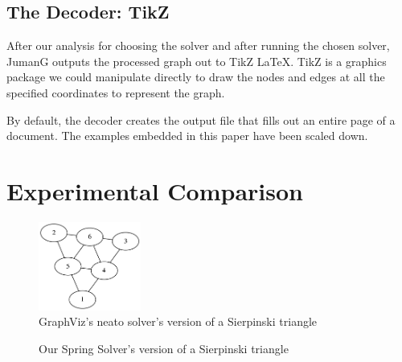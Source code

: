 \documentclass{article}
\begin{document}
\subsection{The Decoder: TikZ}
After our analysis for choosing the solver and after running the chosen solver, JumanG outputs the processed graph out to TikZ LaTeX. TikZ is a graphics package we could manipulate directly to draw the nodes and edges at all the specified coordinates to represent the graph.

By default, the decoder creates the output file that fills out an entire page of a document. The examples embedded in this paper have been scaled down.




\section{Experimental Comparison}

\begin{figure}[h!]
\caption{GraphViz's neato solver's version of a Sierpinski triangle}
\label{neatoSierpinski}
\centering
\includegraphics[width=0.3\textwidth]{serp.png}
\end{figure}

\begin{figure}
\caption{Our Spring Solver's version of a Sierpinski triangle}
\label{springSierpinski}
\end{figure}
\end{document}
